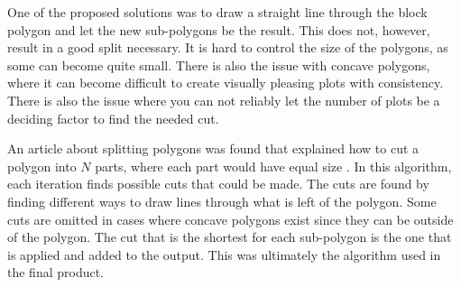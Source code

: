 One of the proposed solutions was to draw a straight line through the block polygon and let the new sub-polygons be the result. 
This does not, however, result in a good split necessary. 
It is hard to control the size of the polygons, as some can become quite small. 
There is also the issue with concave polygons, where it can become difficult to create visually pleasing plots with consistency. 
There is also the issue where you can not reliably let the number of plots be a deciding factor to find the needed cut. 

An article about splitting polygons was found that explained how to cut a polygon into $N$ parts, where each part would have equal size \cite{polygon_splitting_article}. 
In this algorithm, each iteration finds possible cuts that could be made. 
The cuts are found by finding different ways to draw lines through what is left of the polygon. 
Some cuts are omitted in cases where concave polygons exist since they can be outside of the polygon. 
The cut that is the shortest for each sub-polygon is the one that is applied and added to the output. 
This was ultimately the algorithm used in the final product. 
